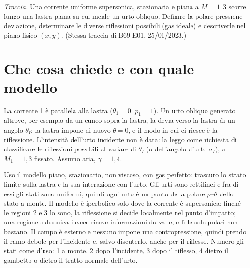 

\graphicspath{{../../svolgimenti/1970-02-01_E01_riflessione_urto/figure/}}



\maketitle

\emph{Traccia.} Una corrente uniforme supersonica, stazionaria e piana a $M=1{,}3$ scorre lungo una lastra piana
su cui incide un urto obliquo. Definire la polare pressione--deviazione, determinare le diverse riflessioni possibili
(gas ideale) e descriverle nel piano fisico $(x,y)$. (Stessa traccia di B69-E01, 25/01/2023.)

\section*{Che cosa chiede e con quale modello}
La corrente 1 è parallela alla lastra ($\theta_1=0$, $p_1=1$). Un urto obliquo generato altrove, per esempio da un
cuneo sopra la lastra, la devia verso la lastra di un angolo $\theta_I$; la lastra impone di nuovo $\theta=0$, e il
modo in cui ci riesce è la riflessione. L'intensità dell'urto incidente non è data: la leggo come richiesta di
classificare le riflessioni possibili al variare di $\theta_I$ (o dell'angolo d'urto $\sigma_I$), a $M_1=1{,}3$
fissato. Assumo aria, $\gamma=1{,}4$.

Uso il modello piano, stazionario, non viscoso, con gas perfetto: trascuro lo strato limite sulla lastra e la sua
interazione con l'urto. Gli urti sono rettilinei e fra di essi gli stati sono uniformi, quindi ogni urto è un punto
della polare $p$--$\theta$ dello stato a monte. Il modello è iperbolico solo dove la corrente è supersonica: finché
le regioni 2 e 3 lo sono, la riflessione si decide localmente nel punto d'impatto; una regione subsonica invece
riceve informazioni da valle, e lì le sole polari non bastano. Il campo è esterno e nessuno impone una
contropressione, quindi prendo il ramo debole per l'incidente e, salvo discuterlo, anche per il riflesso. Numero gli
stati come d'uso: 1 a monte, 2 dopo l'incidente, 3 dopo il riflesso, 4 dietro il gambetto o dietro il tratto normale
dell'urto.


